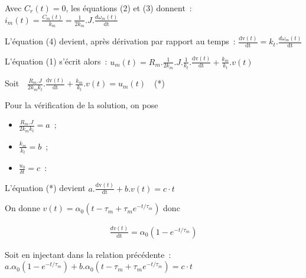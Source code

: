 \begin{texteCache}



  

  Avec \(C_{r}\left( t \right) = 0\), les équations (2) et (3) donnent~:
  \(i_{m}\left( t \right) = \frac{C_{m}\left( t \right)}{k_{m}} = \frac{1}{2k_{m}}.J.\frac{d\omega_{m}\left( t \right)}{\text{dt}}\)

  L'équation (4) devient, après dérivation par rapport au temps~:
  \(\frac{\text{dv}\left( t \right)}{\text{dt}} = k_{t}.\frac{d\omega_{m}(t)}{\text{dt}}\)

  L'équation (1) s'écrit alors~:
  \(u_{m}\left( t \right) = R_{m}.\frac{1}{2k_{m}}.J.\frac{1}{k_{t}}.\frac{\text{dv}\left( t \right)}{\text{dt}} + \frac{k_{m}}{k_{t}}.v\left( t \right)\)

  Soit
  \(\text{\ \ }\frac{R_{m}.J}{2k_{m}k_{t}}.\frac{\text{dv}\left( t \right)}{\text{dt}} + \frac{k_{m}}{k_{t}}.v\left( t \right) = u_{m}\left( t \right)\text{\ \ }\)
  (*)
  
  \vspace{3cm}
  \end{texteCache}
  
  


\begin{texteCache}

  Pour la vérification de la solution, on pose
  
  \begin{itemize}
  \item  \(\frac{R_{m}.J}{2k_{m}k_{t}} = a\)~;
  
  \item  \(\frac{k_{m}}{k_{t}} = b\)~;


 \item  \(\frac{u_{0}}{\delta t} = c\)~:
  \end{itemize}
 

  L'équation (*) devient
  \(a.\frac{\text{dv}\left( t \right)}{\text{dt}} + b.v\left( t \right) = c\cdot t\)

  On donne
  \(v\left( t \right) = \alpha_{0}(t - \tau_{m} + \tau_{m}e^{- t/\tau_{m}})\)
  donc
  
  \begin{align*}
   \frac{dv(t)}{\text{dt}} = \alpha_{0}(1 - e^{- t/\tau_{m}})
  \end{align*}

  Soit en injectant dans la relation précédente~:
  \(a.\alpha_{0}(1 - e^{- t/\tau_{m}}) + b.\alpha_{0}(t - \tau_{m} + \tau_{m}e^{- t/\tau_{m}}) = c\cdot t\)
\vspace{3cm}
  \end{texteCache}
  
